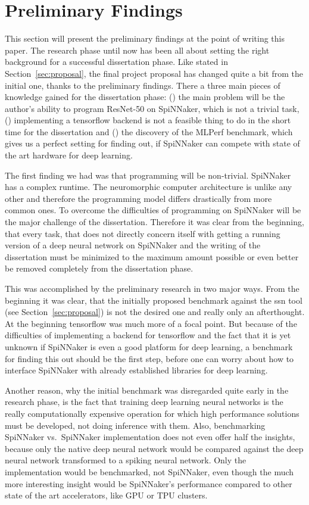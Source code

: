 \documentclass{article}
\begin{document}

\section{Preliminary Findings} %
\label{sec:prelim}

This section will present the preliminary findings at the
point of writing this paper.
The research phase until now has been all about setting the
right background for a successful dissertation phase.
Like stated in Section~\ref{sec:proposal}, the final
project proposal has changed quite a bit from the initial
one, thanks to the preliminary findings.
There a three main pieces of knowledge gained for the
dissertation phase: () the main problem
will be the author's ability to program ResNet-50 on
SpiNNaker, which is not a trivial task, ()
implementing a tensorflow backend is not a feasible thing
to do in the short time for the dissertation and
() the discovery of the MLPerf benchmark,
which gives us a perfect setting for finding out, if
SpiNNaker can compete with state of the art hardware for
deep learning.

The first finding we had was that programming will be
non-trivial.
SpiNNaker has a complex runtime.
The neuromorphic computer architecture is unlike any other
and therefore the programming model differs drastically
from more common ones.
To overcome the difficulties of programming on SpiNNaker
will be the major challenge of the dissertation.
Therefore it was clear from the beginning, that every task,
that does not directly concern itself with getting a
running version of a deep neural network on
SpiNNaker and the writing of the dissertation must be
minimized to the maximum amount possible or even better be
removed completely from the dissertation phase.

This was accomplished by the preliminary research in two
major ways.
From the beginning it was clear, that the initially
proposed benchmark against the ssn tool (see
Section~\ref{sec:proposal}) is not the desired one and
really only an afterthought.
At the beginning tensorflow was much more of a focal point.
But because of the difficulties of implementing a backend
for tensorflow and the fact that it is yet unknown if
SpiNNaker is even a good platform for deep learning, a
benchmark for finding this out should be the first step,
before one can worry about how to interface SpiNNaker with
already established libraries for deep learning.

Another reason, why the initial benchmark was disregarded
quite early in the research phase, is the fact that
training deep learning neural networks is the really
computationally expensive operation for which high
performance solutions must be developed, not doing
inference with them.
Also, benchmarking SpiNNaker vs.\ SpiNNaker implementation
does not even offer half the insights, because only the
native deep neural network would be compared against the
deep neural network transformed to a spiking neural
network.
Only the implementation would be benchmarked, not
SpiNNaker, even though the much more interesting insight
would be SpiNNaker's performance compared to other state
of the art accelerators, like GPU or TPU clusters.
\end{document}
